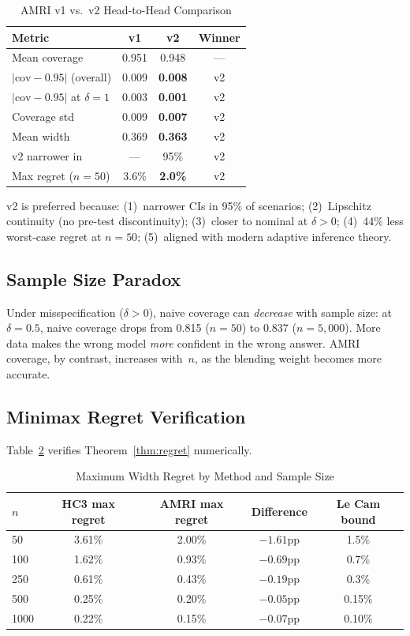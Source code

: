 \documentclass[12pt]{article}
\theoremstyle{definition}
\theoremstyle{remark}
\begin{document}
\begin{table}[H]
\centering
\caption{AMRI v1 vs.\ v2 Head-to-Head Comparison}
\label{tab:v1v2}
\begin{tabular}{lccc}
\toprule
Metric & v1 & v2 & Winner \\
\midrule
Mean coverage & 0.951 & 0.948 & --- \\
$|\text{cov} - 0.95|$ (overall) & 0.009 & \textbf{0.008} & v2 \\
$|\text{cov} - 0.95|$ at $\delta = 1$ & 0.003 & \textbf{0.001} & v2 \\
Coverage std & 0.009 & \textbf{0.007} & v2 \\
Mean width & 0.369 & \textbf{0.363} & v2 \\
v2 narrower in & --- & 95\% & v2 \\
Max regret ($n = 50$) & 3.6\% & \textbf{2.0\%} & v2 \\
\bottomrule
\end{tabular}
\end{table}

v2 is preferred because: (1)~narrower CIs in 95\% of scenarios; (2)~Lipschitz continuity (no pre-test discontinuity); (3)~closer to nominal at $\delta > 0$; (4)~44\% less worst-case regret at $n = 50$; (5)~aligned with modern adaptive inference theory.

\subsection{Sample Size Paradox}

Under misspecification ($\delta > 0$), naive coverage can \emph{decrease} with sample size: at $\delta = 0.5$, naive coverage drops from 0.815 ($n = 50$) to 0.837 ($n = 5{,}000$). More data makes the wrong model \emph{more} confident in the wrong answer. AMRI coverage, by contrast, increases with~$n$, as the blending weight becomes more accurate.

\subsection{Minimax Regret Verification}

Table~\ref{tab:minimax} verifies Theorem~\ref{thm:regret} numerically.

\begin{table}[H]
\centering
\caption{Maximum Width Regret by Method and Sample Size}
\label{tab:minimax}
\begin{tabular}{lcccc}
\toprule
$n$ & HC3 max regret & AMRI max regret & Difference & Le Cam bound \\
\midrule
50 & 3.61\% & 2.00\% & $-1.61$pp & 1.5\% \\
100 & 1.62\% & 0.93\% & $-0.69$pp & 0.7\% \\
250 & 0.61\% & 0.43\% & $-0.19$pp & 0.3\% \\
500 & 0.25\% & 0.20\% & $-0.05$pp & 0.15\% \\
1000 & 0.22\% & 0.15\% & $-0.07$pp & 0.10\% \\
\bottomrule
\end{tabular}
\end{table}
\end{document}
